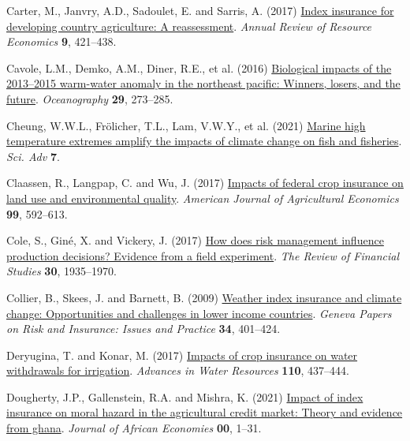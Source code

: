 \documentclass[
  letterpaper,
  DIV=11,
  numbers=noendperiod]{scrartcl}
\newlength{\cslhangindent}
\newlength{\cslentryspacingunit} %
\newenvironment{CSLReferences}[2] %
 {%
  \setlength{\parindent}{0pt}
  \ifodd #1
  \let\oldpar\par
  \def\par{\hangindent=\cslhangindent\oldpar}
  \fi
  \setlength{\parskip}{#2\cslentryspacingunit}
 }%
 {}
\theoremstyle{plain}
\theoremstyle{plain}
\theoremstyle{remark}
\begin{document}
\begin{CSLReferences}{1}{0}
\leavevmode{}%
Carter, M., Janvry, A.D., Sadoulet, E. and Sarris, A. (2017)
\href{https://doi.org/10.1146/annurev-resource-100516-053352}{Index
insurance for developing country agriculture: A reassessment}.
\emph{Annual Review of Resource Economics} \textbf{9}, 421--438.

\leavevmode{}%
Cavole, L.M., Demko, A.M., Diner, R.E., et al. (2016)
\href{https://doi.org/10.5670/oceanog.2016.32}{Biological impacts of the
2013--2015 warm-water anomaly in the northeast pacific: Winners, losers,
and the future}. \emph{Oceanography} \textbf{29}, 273--285.

\leavevmode{}%
Cheung, W.W.L., Frölicher, T.L., Lam, V.W.Y., et al. (2021)
\href{https://www.science.org}{Marine high temperature extremes amplify
the impacts of climate change on fish and fisheries}. \emph{Sci. Adv}
\textbf{7}.

\leavevmode{}%
Claassen, R., Langpap, C. and Wu, J. (2017)
\href{https://doi.org/10.1093/AJAE/AAW075}{Impacts of federal crop
insurance on land use and environmental quality}. \emph{American Journal
of Agricultural Economics} \textbf{99}, 592--613.

\leavevmode{}%
Cole, S., Giné, X. and Vickery, J. (2017)
\href{https://doi.org/10.1093/rfs/hhw080}{How does risk management
influence production decisions? Evidence from a field experiment}.
\emph{The Review of Financial Studies} \textbf{30}, 1935--1970.

\leavevmode{}%
Collier, B., Skees, J. and Barnett, B. (2009)
\href{https://doi.org/10.1057/gpp.2009.11}{Weather index insurance and
climate change: Opportunities and challenges in lower income countries}.
\emph{Geneva Papers on Risk and Insurance: Issues and Practice}
\textbf{34}, 401--424.

\leavevmode{}%
Deryugina, T. and Konar, M. (2017)
\href{https://doi.org/10.1016/j.advwatres.2017.03.013}{Impacts of crop
insurance on water withdrawals for irrigation}. \emph{Advances in Water
Resources} \textbf{110}, 437--444.

\leavevmode{}%
Dougherty, J.P., Gallenstein, R.A. and Mishra, K. (2021)
\href{https://doi.org/10.1093/jafeco/ejab003}{Impact of index insurance
on moral hazard in the agricultural credit market: Theory and evidence
from ghana}. \emph{Journal of African Economies} \textbf{00}, 1--31.


\end{CSLReferences}
\end{document}
